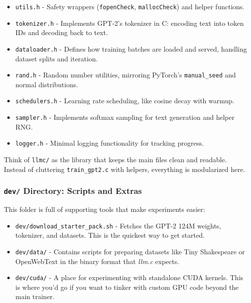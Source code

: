 \documentclass[
  letterpaper,
  DIV=11,
  numbers=noendperiod]{scrreprt}
\providecommand{\tightlist}{%
  \setlength{\itemsep}{0pt}\setlength{\parskip}{0pt}}
\begin{document}
\begin{itemize}
\tightlist
\item
  \texttt{utils.h} - Safety wrappers (\texttt{fopenCheck},
  \texttt{mallocCheck}) and helper functions.
\item
  \texttt{tokenizer.h} - Implements GPT-2's tokenizer in C: encoding
  text into token IDs and decoding back to text.
\item
  \texttt{dataloader.h} - Defines how training batches are loaded and
  served, handling dataset splits and iteration.
\item
  \texttt{rand.h} - Random number utilities, mirroring PyTorch's
  \texttt{manual\_seed} and normal distributions.
\item
  \texttt{schedulers.h} - Learning rate scheduling, like cosine decay
  with warmup.
\item
  \texttt{sampler.h} - Implements softmax sampling for text generation
  and helper RNG.
\item
  \texttt{logger.h} - Minimal logging functionality for tracking
  progress.
\end{itemize}

Think of \texttt{llmc/} as the library that keeps the main files clean
and readable. Instead of cluttering \texttt{train\_gpt2.c} with helpers,
everything is modularized here.

\subsubsection{\texorpdfstring{\texttt{dev/} Directory: Scripts and
Extras}{dev/ Directory: Scripts and Extras}}\label{dev-directory-scripts-and-extras}

This folder is full of supporting tools that make experiments easier:

\begin{itemize}
\tightlist
\item
  \texttt{dev/download\_starter\_pack.sh} - Fetches the GPT-2 124M
  weights, tokenizer, and datasets. This is the quickest way to get
  started.
\item
  \texttt{dev/data/} - Contains scripts for preparing datasets like Tiny
  Shakespeare or OpenWebText in the binary format that \emph{llm.c}
  expects.
\item
  \texttt{dev/cuda/} - A place for experimenting with standalone CUDA
  kernels. This is where you'd go if you want to tinker with custom GPU
  code beyond the main trainer.
\end{itemize}
\end{document}
